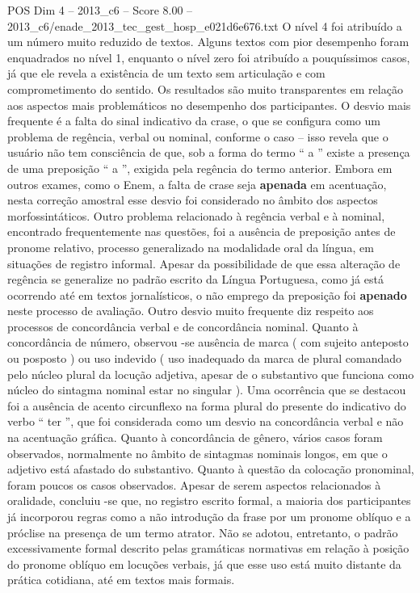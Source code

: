 \begin{textsample}{POS Dim 4 – 2013\_c6 – Score 8.00 – 2013\_c6/enade\_2013\_tec\_gest\_hosp\_e021d6e676.txt}
O nível 4 foi atribuído a um número muito reduzido de textos.
Alguns textos com pior desempenho foram enquadrados no nível 1, enquanto o nível zero foi atribuído a pouquíssimos casos, já que ele revela a existência de um texto sem articulação e com comprometimento do sentido.
Os resultados são muito transparentes em relação aos aspectos mais problemáticos no desempenho dos participantes.
O desvio mais frequente é a falta do sinal indicativo da crase, o que se configura como um problema de regência, verbal ou nominal, conforme o caso – isso revela que o usuário não tem consciência de que, sob a forma do termo “ a ” existe a presença de uma preposição “ a ”, exigida pela regência do termo anterior.
Embora em outros exames, como o Enem, a falta de crase seja \textbf{apenada} em acentuação, nesta correção amostral esse desvio foi considerado no âmbito dos aspectos morfossintáticos.
Outro problema relacionado à regência verbal e à nominal, encontrado frequentemente nas questões, foi a ausência de preposição antes de pronome relativo, processo generalizado na modalidade oral da língua, em situações de registro informal.
Apesar da possibilidade de que essa alteração de regência se generalize no padrão escrito da Língua Portuguesa, como já está ocorrendo até em textos jornalísticos, o não emprego da preposição foi \textbf{apenado} neste processo de avaliação.
Outro desvio muito frequente diz respeito aos processos de concordância verbal e de concordância nominal.
Quanto à concordância de número, observou -se ausência de marca ( com sujeito anteposto ou posposto ) ou uso indevido ( uso inadequado da marca de plural comandado pelo núcleo plural da locução adjetiva, apesar de o substantivo que funciona como núcleo do sintagma nominal estar no singular ).
Uma ocorrência que se destacou foi a ausência de acento circunflexo na forma plural do presente do indicativo do verbo “ ter ”, que foi considerada como um desvio na concordância verbal e não na acentuação gráfica.
Quanto à concordância de gênero, vários casos foram observados, normalmente no âmbito de sintagmas nominais longos, em que o adjetivo está afastado do substantivo.
Quanto à questão da colocação pronominal, foram poucos os casos observados.
Apesar de serem aspectos relacionados à oralidade, concluiu -se que, no registro escrito formal, a maioria dos participantes já incorporou regras como a não introdução da frase por um pronome oblíquo e a próclise na presença de um termo atrator.
Não se adotou, entretanto, o padrão excessivamente formal descrito pelas gramáticas normativas em relação à posição do pronome oblíquo em locuções verbais, já que esse uso está muito distante da prática cotidiana, até em textos mais formais.

\end{textsample}
